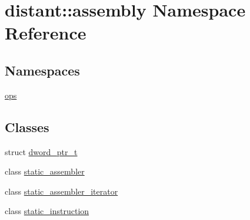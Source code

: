 \hypertarget{namespacedistant_1_1assembly}{}\section{distant\+:\+:assembly Namespace Reference}
\label{namespacedistant_1_1assembly}
\subsection*{Namespaces}
\begin{DoxyCompactItemize}
\item 
 \mbox{\hyperlink{namespacedistant_1_1assembly_1_1ops}{ops}}
\end{DoxyCompactItemize}
\subsection*{Classes}
\begin{DoxyCompactItemize}
\item 
struct \mbox{\hyperlink{structdistant_1_1assembly_1_1dword__ptr__t}{dword\+\_\+ptr\+\_\+t}}
\item 
class \mbox{\hyperlink{classdistant_1_1assembly_1_1static__assembler}{static\+\_\+assembler}}
\item 
class \mbox{\hyperlink{classdistant_1_1assembly_1_1static__assembler__iterator}{static\+\_\+assembler\+\_\+iterator}}
\item 
class \mbox{\hyperlink{classdistant_1_1assembly_1_1static__instruction}{static\+\_\+instruction}}
\end{DoxyCompactItemize}
